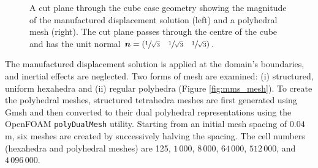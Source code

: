 \documentclass[sn-mathphys,Numbered]{sn-jnl}%
\newcommand{\bb}{\boldsymbol}
\begin{document}
\begin{figure}[htbp]
	\centering
	\caption{A cut plane through the cube case geometry showing the magnitude of the manufactured displacement solution (left) and a polyhedral mesh (right). The cut plane passes through the centre of the cube and has the unit normal $\bb{n} = (\sfrac{1}{\sqrt{3}} \quad \sfrac{1}{\sqrt{3}} \quad \sfrac{1}{\sqrt{3}})$.}
	\label{fig:mms}
\end{figure}

The manufactured displacement solution is applied at the domain's boundaries, and inertial effects are neglected.
Two forms of mesh are examined: (i) structured, uniform hexahedra and (ii) regular polyhedra (Figure \ref{fig:mms_mesh}).
To create the polyhedral meshes, structured tetrahedra meshes are first generated using Gmsh \cite{geuzaine2009gmsh} and then converted to their dual polyhedral representations using the OpenFOAM \texttt{polyDualMesh} utility.
Starting from an initial mesh spacing of $0.04$ m, six meshes are created by successively halving the spacing.
The cell numbers (hexahedra and polyhedral meshes) are 125, $1\,000$, $8\,000$, $64\,000$, $512\,000$, and $4\,096\,000$.
\end{document}
